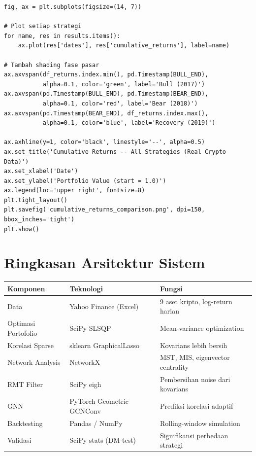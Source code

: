 \documentclass[12pt,a4paper]{article}
\begin{document}
\begin{lstlisting}[caption={Plot cumulative returns (ringkasan logika)}]
fig, ax = plt.subplots(figsize=(14, 7))

# Plot setiap strategi
for name, res in results.items():
    ax.plot(res['dates'], res['cumulative_returns'], label=name)

# Tambah shading fase pasar
ax.axvspan(df_returns.index.min(), pd.Timestamp(BULL_END),
           alpha=0.1, color='green', label='Bull (2017)')
ax.axvspan(pd.Timestamp(BULL_END), pd.Timestamp(BEAR_END),
           alpha=0.1, color='red', label='Bear (2018)')
ax.axvspan(pd.Timestamp(BEAR_END), df_returns.index.max(),
           alpha=0.1, color='blue', label='Recovery (2019)')

ax.axhline(y=1, color='black', linestyle='--', alpha=0.5)
ax.set_title('Cumulative Returns -- All Strategies (Real Crypto Data)')
ax.set_xlabel('Date')
ax.set_ylabel('Portfolio Value (start = 1.0)')
ax.legend(loc='upper right', fontsize=8)
plt.tight_layout()
plt.savefig('cumulative_returns_comparison.png', dpi=150, bbox_inches='tight')
plt.show()
\end{lstlisting}

\section{Ringkasan Arsitektur Sistem}

\begin{center}
\begin{tabular}{lll}
\toprule
\textbf{Komponen} & \textbf{Teknologi} & \textbf{Fungsi} \\
\midrule
Data & Yahoo Finance (Excel) & 9 aset kripto, log-return harian \\
Optimasi Portofolio & SciPy SLSQP & Mean-variance optimization \\
Korelasi Sparse & sklearn GraphicalLasso & Kovarians lebih bersih \\
Network Analysis & NetworkX & MST, MIS, eigenvector centrality \\
RMT Filter & SciPy eigh & Pembersihan noise dari kovarians \\
GNN & PyTorch Geometric GCNConv & Prediksi korelasi adaptif \\
Backtesting & Pandas / NumPy & Rolling-window simulation \\
Validasi & SciPy stats (DM-test) & Signifikansi perbedaan strategi \\
\bottomrule
\end{tabular}
\end{center}
\end{document}
